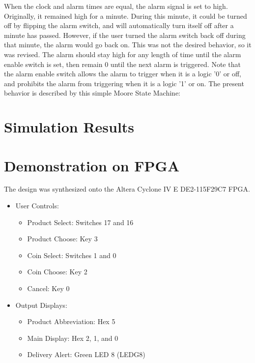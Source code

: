 \documentclass[12pt]{article}
\begin{document}
\newpage

When the clock and alarm times are equal, the alarm signal is set to high.  Originally, it remained high for a minute.  During this minute, it could be turned off by flipping the alarm switch, and will automatically turn itself off after a minute has passed.  However, if the user turned the alarm switch back off during that minute, the alarm would go back on.  This was not the desired behavior, so it was revised.  The alarm should stay high for any length of time until the alarm enable switch is set, then remain 0 until the next alarm is triggered.  Note that the alarm enable switch allows the alarm to trigger when it is a logic '0' or off, and prohibits the alarm from triggering when it is a logic '1' or on.  The present behavior is described by this simple Moore State Machine:


\section{Simulation Results} \label{simresults}


\newpage

\section{Demonstration on FPGA} \label{demo}
The design was synthesized onto the Altera Cyclone IV E DE2-115F29C7 FPGA.
\begin{itemize}
\item User Controls:
	\begin{itemize}
	\item Product Select: Switches 17 and 16
	\item Product Choose: Key 3
	\item Coin Select: Switches 1 and 0
	\item Coin Choose: Key 2
	\item Cancel: Key 0
	\end{itemize}
\item Output Displays:
	\begin{itemize}
	\item Product Abbreviation: Hex 5
	\item Main Display: Hex 2, 1, and 0
	\item Delivery Alert: Green LED 8 (LEDG8)
	\end{itemize}
\end{itemize}
\end{document}
